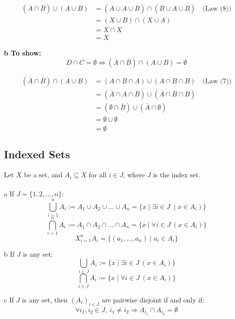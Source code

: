 \begin{align*}
	(\overline{A} \cap \overline{B}) \cup (A \cup B)
	 & = (\overline{A} \cup A \cup B) \cap (\overline{B} \cup A \cup B) \quad \text{(Law (8))} \\
	 & = (X \cup B) \cap (X \cup A)                                                            \\
	 & = X \cap X                                                                              \\
	 & = X
\end{align*}

\textbf{b To show:}
\[
	D \cap C = \emptyset \iff (\overline{A} \cap \overline{B}) \cap (A \cup B) = \emptyset
\]

\begin{align*}
	(\overline{A} \cap \overline{B}) \cap (A \cup B)
	 & = (A \cap B \cap A) \cup (A \cap B \cap B) \quad \text{(Law (7))}                      \\
	 & = (\overline{A} \cap A \cap \overline{B}) \cup (\overline{A} \cap \overline{B} \cap B) \\
	 & = (\emptyset \cap \overline{B}) \cup (\overline{A} \cap \emptyset)                     \\
	 & = \emptyset \cup \emptyset                                                             \\
	 & = \emptyset
\end{align*}

\subsection{Indexed Sets}

Let \( X \) be a set, and \( A_i \subseteq X \) for all \( i \in J \), where \( J \) is the index set.
\\\\
a If \( J = \{1, 2, \dots, n\} \):
\[
	\bigcup_{i=1}^{n} A_i := A_1 \cup A_2 \cup \dots \cup A_n = \{ x \mid \exists i \in J \ (x \in A_i) \}
\]
\[
	\bigcap_{i=1}^{n} A_i := A_1 \cap A_2 \cap \dots \cap A_n = \{ x \mid \forall i \in J \ (x \in A_i) \}
\]
\[
	X_{i=1}^{n} A_i = \{(a_1, \dots, a_n) \mid a_i \in A_i \}
\]

b If \( J \) is any set:
\[
	\bigcup_{i \in J} A_i := \{ x \mid \exists i \in J \ (x \in A_i) \}
\]
\[
	\bigcap_{i \in J} A_i := \{ x \mid \forall i \in J \ (x \in A_i) \}
\]

c If \( J \) is any set, then \( (A_i)_{i \in J} \) are pairwise disjoint if and only if:
\[
	\forall i_1, i_2 \in J, \ i_1 \neq i_2 \Rightarrow A_{i_1} \cap A_{i_2} = \emptyset
\]

